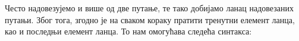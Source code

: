 Често надовезујемо и више од две путање, те тако добијамо ланац надовезаних путањи. Због тога, згодно је на сваком кораку пратити тренутни елемент ланца, као и последњи елемент ланца. То нам омогућава следећа синтакса:
\begin{code}%
\>[0]%
\>[1198I]\AgdaSymbol{:}\AgdaSpace{}%
\AgdaSymbol{\{}\AgdaSpace{}%
\AgdaSymbol{:}\AgdaSpace{}%
\AgdaSpace{}%
\AgdaSpace{}%
\AgdaSymbol{\}}\AgdaSpace{}%
\AgdaSymbol{(}\AgdaSpace{}%
\AgdaSymbol{:}\AgdaSpace{}%
\AgdaSymbol{)}\AgdaSpace{}%
\AgdaSymbol{\{}\AgdaSpace{}%
\AgdaSpace{}%
\AgdaSymbol{:}\AgdaSpace{}%
\AgdaSymbol{\}}\<%
\\
\>[.][@{}l@{}]\<[1198I]%
\>[8]\AgdaSpace{}%
\AgdaSpace{}%
\AgdaOperator{\AgdaFunction{==}}\AgdaSpace{}%
\AgdaSpace{}%
\AgdaSpace{}%
\AgdaSpace{}%
\AgdaOperator{\AgdaFunction{==}}\AgdaSpace{}%
\AgdaSpace{}%
\AgdaSpace{}%
\AgdaSpace{}%
\AgdaOperator{\AgdaFunction{==}}\AgdaSpace{}%
\<%
\\
\>[0]\AgdaSpace{}%
\AgdaSpace{}%
\AgdaSpace{}%
\AgdaSpace{}%
\AgdaSpace{}%
\AgdaSymbol{=}\AgdaSpace{}%
\AgdaSpace{}%
\AgdaSpace{}%
\<%
\\
%
\\[\AgdaEmptyExtraSkip]%
\>[0]%
\>[1230I]\AgdaSymbol{:}\AgdaSpace{}%
\AgdaSymbol{\{}\AgdaSpace{}%
\AgdaSymbol{:}\AgdaSpace{}%
\AgdaSpace{}%
\AgdaSpace{}%
\AgdaSymbol{\}}\AgdaSpace{}%
\AgdaSymbol{(}\AgdaSpace{}%
\AgdaSymbol{:}\AgdaSpace{}%
\AgdaSymbol{)}\<%
\\
\>[1230I][@{}l@{\AgdaIndent{0}}]%
\>[4]\AgdaSpace{}%
\AgdaSpace{}%
\AgdaOperator{\AgdaFunction{==}}\AgdaSpace{}%
\<%
\\
\>[0]\AgdaSpace{}%
\AgdaSpace{}%
\AgdaSymbol{=}\AgdaSpace{}%
\AgdaSpace{}%
\<%
\end{code}

